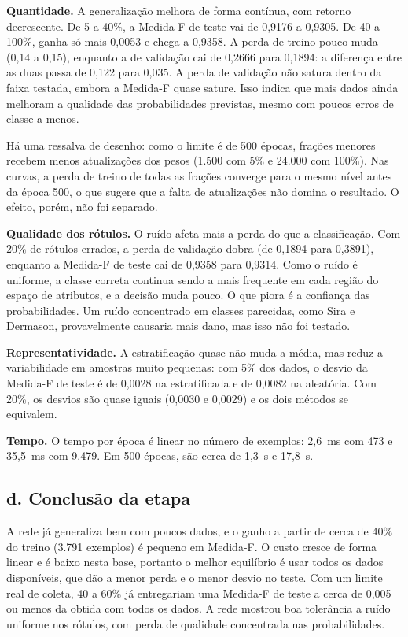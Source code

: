 \textbf{Quantidade.} A generalização melhora de forma contínua, com retorno decrescente. De 5 a 40\%, a Medida-F de teste vai de 0,9176 a 0,9305. De 40 a 100\%, ganha só mais 0,0053 e
chega a 0,9358. A perda de treino pouco muda (0,14 a 0,15), enquanto a de validação cai de 0,2666 para 0,1894: a diferença entre as duas passa de 0,122 para 0,035. A perda de
validação não satura dentro da faixa testada, embora a Medida-F quase sature. Isso indica que mais dados ainda melhoram a qualidade das probabilidades previstas, mesmo com poucos erros de classe a menos.

Há uma ressalva de desenho: como o limite é de 500 épocas, frações menores recebem menos atualizações dos pesos (1.500 com 5\% e 24.000 com 100\%). Nas curvas, a perda de treino de todas
as frações converge para o mesmo nível antes da época 500, o que sugere que a falta de atualizações não domina o resultado. O efeito, porém, não foi separado.

\textbf{Qualidade dos rótulos.} O ruído afeta mais a perda do que a classificação. Com 20\% de rótulos errados, a perda de validação dobra (de 0,1894 para 0,3891), enquanto a Medida-F de
teste cai de 0,9358 para 0,9314. Como o ruído é uniforme, a classe correta continua sendo a mais frequente em cada região do espaço de atributos, e a decisão muda pouco. O que piora
é a confiança das probabilidades. Um ruído concentrado em classes parecidas, como Sira e Dermason, provavelmente causaria mais dano, mas isso não foi testado.

\textbf{Representatividade.} A estratificação quase não muda a média, mas reduz a variabilidade em amostras muito pequenas: com 5\% dos dados, o desvio da Medida-F de teste é de 0,0028 na
estratificada e de 0,0082 na aleatória. Com 20\%, os desvios são quase iguais (0,0030 e 0,0029) e os dois métodos se equivalem.

\textbf{Tempo.} O tempo por época é linear no número de exemplos: 2,6~ms com 473 e 35,5~ms com 9.479. Em 500 épocas, são cerca de 1,3~s e 17,8~s.

\subsection*{d. Conclusão da etapa}

A rede já generaliza bem com poucos dados, e o ganho a partir de cerca de 40\% do treino (3.791 exemplos) é pequeno em Medida-F. O custo cresce de forma linear e é baixo nesta base, portanto o melhor
equilíbrio é usar todos os dados disponíveis, que dão a menor perda e o menor desvio no teste. Com um limite real de coleta, 40 a 60\% já entregariam uma Medida-F de teste a cerca de 0,005 ou menos da obtida com todos os dados.
A rede mostrou boa tolerância a ruído uniforme nos rótulos, com perda de qualidade concentrada nas probabilidades.

\FloatBarrier
